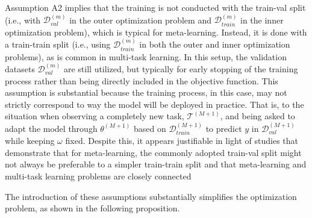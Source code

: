 \documentclass[3p,times,twocolumn]{elsarticle}
\begin{document}
Assumption A2 implies that the training is not conducted with the train-val split (i.e., with $\mathcal{D}_{val}^{(m)}$ in the outer optimization problem and $\mathcal{D}_{train}^{(m)}$ in the inner optimization problem), which is typical for meta-learning. 
Instead, it is done with a train-train split (i.e., using $\mathcal{D}_{train}^{(m)}$ in both the outer and inner optimization problems), as is common in multi-task learning.
In this setup, the validation datasets $\mathcal{D}_{val}^{(m)}$ are still utilized, but typically for early stopping of the training process rather than being directly included in the objective function.
This assumption is substantial because the training process, in this case, may not strictly correspond to way the model will be deployed in practice. 
That is, to the situation when observing a completely new task, $\mathcal{T}^{(M+1)}$, and being asked to adapt the model through $\theta^{(M+1)}$ based on $\mathcal{D}^{(M+1)}_{train}$ to predict $y$ in $\mathcal{D}^{(M+1)}_{val}$ while keeping $\omega$ fixed.
Despite this, it appears justifiable in light of studies that demonstrate that for meta-learning, the commonly adopted train-val split might not always be preferable to a simpler train-train split \citep{baiHowImportantTrainValidation2021} and that meta-learning and multi-task learning problems are closely connected \citep{wangBridgingMultitaskLearning2021}

The introduction of these assumptions substantially simplifies the optimization problem, as shown in the following proposition.
\end{document}
